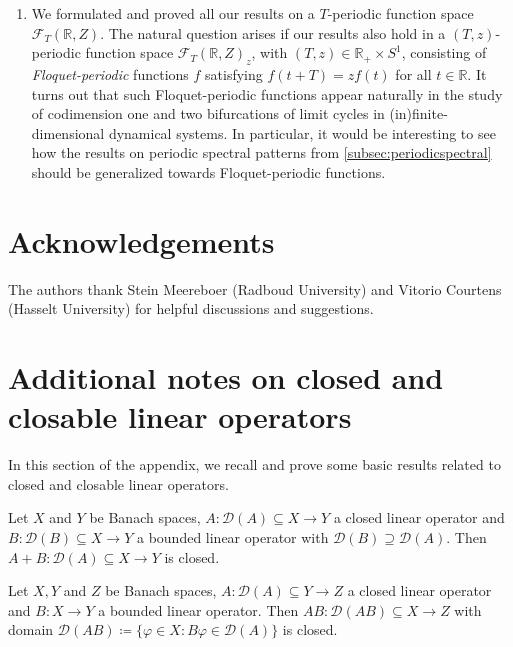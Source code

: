 \documentclass[english]{myarticle}
\begin{document}
\begin{sloppypar}
\begin{enumerate}
    \item We formulated and proved all our results on a $T$-periodic function space $\mathcal{F}_T(\mathbb{R},Z)$. The natural question arises if our results also hold in a $(T,z)$-periodic function space $\mathcal{F}_T(\mathbb{R},Z)_z$, with $(T,z) \in \mathbb{R}_{+} \times S^1$, consisting of \emph{Floquet-periodic} functions $f$ satisfying $f(t+T) = zf(t)$ for all $t \in \mathbb{R}$. It turns out that such Floquet-periodic functions appear naturally in the study of codimension one \cite{Kuznetsov2005,Bosschaert2025} and two \cite{Witte2013,Witte2014} bifurcations of limit cycles in (in)finite-dimensional dynamical systems. In particular, it would be interesting to see how the results on periodic spectral patterns from \cref{subsec:periodicspectral} should be generalized towards Floquet-periodic functions.
\end{enumerate}

\section*{Acknowledgements}
The authors thank Stein Meereboer (Radboud University) and Vitorio Courtens (Hasselt University) for helpful discussions and suggestions.

\appendix

\section{Additional notes on closed and closable linear operators} \label{appendix:closedclosable}
In this section of the appendix, we recall and prove some basic results related to closed and closable linear operators.

\begin{lemma} \label{lemma:closedsum}
    Let $X$ and $Y$ be Banach spaces, $A : \mathcal{D}(A) \subseteq X \to Y$ a closed linear operator and $B : \mathcal{D}(B) \subseteq X \to Y$ a bounded linear operator with $\mathcal{D}(B) \supseteq \mathcal{D}(A)$. Then $A + B : \mathcal{D}(A) \subseteq X \to Y$ is closed.
\end{lemma}

\begin{lemma} \label{lemma:compositionclosed}
    Let $X,Y$ and $Z$ be Banach spaces, $A : \mathcal{D}(A) \subseteq Y \to Z$ a closed linear operator and $B : X \to Y$ a bounded linear operator. Then $AB : \mathcal{D}(AB) \subseteq X \to Z$ with domain $\mathcal{D}(AB) \coloneqq \{\varphi \in X : B \varphi \in \mathcal{D}(A) \}$ is closed.
\end{lemma}



\end{sloppypar}
\end{document}
